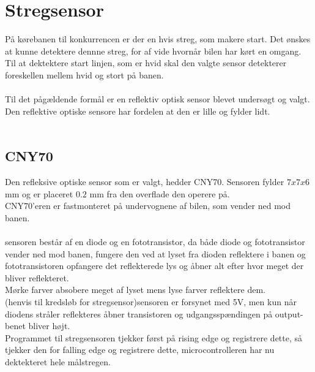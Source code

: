 \section{Stregsensor}
På kørebanen til konkurrencen er der en hvis streg, som makere start. Det ønskes at kunne detektere dennne streg, for af vide hvornår bilen har kørt en omgang.\\
Til at dektektere start linjen, som er hvid skal den valgte sensor detekterer foreskellen mellem hvid og stort på banen.\\
 \\
Til det pågældende formål er en reflektiv optisk sensor blevet undersøgt og valgt. Den reflektive optiske sensore har fordelen at den er lille og fylder lidt.\\
\\

\subsection{CNY70}
Den refleksive optiske sensor som er valgt, hedder CNY70. Sensoren fylder $7x7x6$ mm og er placeret $0.2$ mm fra den overflade den operere på. \\
CNY70'eren er fastmonteret på undervognene af bilen, som vender ned mod banen.\\
\\
sensoren består af en diode og en fototransistor, da både diode og fototransistor vender ned mod banen, fungere den ved at lyset fra dioden reflektere i banen og fototransistoren opfangere det reflekterede lys og åbner alt efter hvor meget der bliver reflekteret. \\
Mørke farver absobere meget af lyset mens lyse farver reflektere dem. \\
(henvis til kredsløb for stregsensor)sensoren er forsynet med 5V, men kun når diodens stråler reflekteres åbner transistoren og udgangsspændingen på output-benet bliver højt.\\
Programmet til stregsensoren tjekker først på rising edge og registrere dette, så tjekker den for falling edge og registrere dette, microcontrolleren har nu dektekteret hele målstregen. \\

